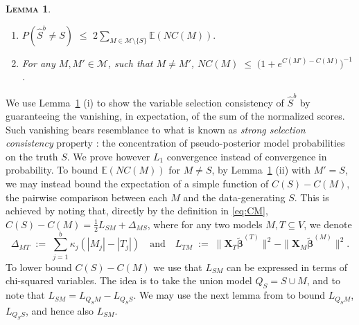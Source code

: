 \documentclass[bj,authoryear]{imsart}
\theoremstyle{plain}
\newtheorem{lem}[thm]{\textsc{Lemma}}
\newcommand{\E}{\mathbb{E}}
\newcommand{\M}{\mathcal{M}}
\newcommand{\bs}{\boldsymbol}
\begin{document}
\begin{lem}\label{lem:L0toL1convergence}
\begin{enumerate}[label=(\roman*)]
\item 
$P(\hat{S}^{b} \neq S) \,\,\leq \,\, 2 \sum_{M \in \M\setminus \{S\}} \E\left(NC(M)\right).$
\item  For any $M,M'\in\M$, such that $M\neq M'$, 
$NC(M)\;\leq \;\big(1+e^{C(M')-C(M)}\big)^{-1}$.
\end{enumerate}
\end{lem}
We use  Lemma~\ref{lem:L0toL1convergence} (i) to show the variable selection consistency of $\hat S^b$ by guaranteeing the vanishing, in expectation, of the sum of the normalized scores. Such vanishing bears resemblance to what is known as \emph{strong selection consistency} property \citep{narisettyhe2014}: the concentration of pseudo-posterior model probabilities on the truth $S$. We prove however $L_1$ convergence instead of convergence in probability.
To bound $\E(NC(M))$ for $M\neq S$, by Lemma~\ref{lem:L0toL1convergence} (ii) with $M'=S$, we may instead bound the expectation of a simple function of $C(S)-C(M)$, the pairwise comparison between each $M$ and the data-generating $S$.
This is achieved by noting that, directly by the definition in \eqref{eq:CM}, $C(S)-C(M)=\tfrac12 L_{SM}+\Delta_{MS}$, where for any two models $M,T\subseteq V$, we denote
\begin{equation}\label{eq:DeltaM}
\Delta_{MT}\;:=\;\sum_{j=1}^b \kappa_j(|M_j|-|T_j|) \quad\text{and} \quad L_{TM}\;:=\;\|\bs X_{T}\tilde{\bs\beta}^{(T)}\|^2-\|\bs X_{M}\tilde{\bs\beta}^{(M)}\|^2.
\end{equation}
To lower bound $C(S)-C(M)$ we use that $L_{SM}$ can be expressed in terms of chi-squared variables.
The idea is to take the union model $Q_S=S\cup M$, and to note that $L_{SM}=L_{Q_SM}-L_{Q_SS}$. We may use the next lemma from \cite{rossell2022concentration} to bound $L_{Q_SM}$, $L_{Q_SS}$, and hence also $L_{SM}$.
\end{document}
